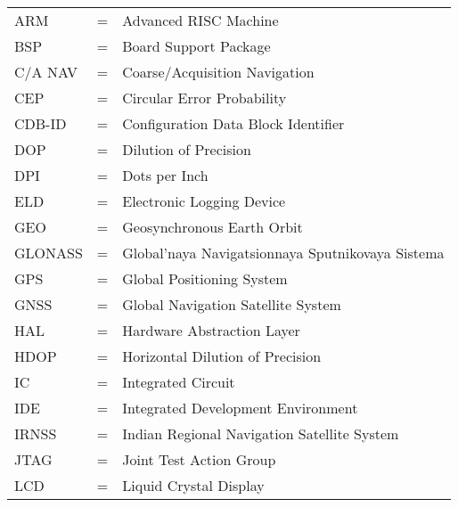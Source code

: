 
\begin{tabular}{llp{3in}}
	ARM &  \hspace{1.5cm} = & Advanced RISC Machine\\
	BSP &  \hspace{1.5cm} = & Board Support Package\\
	C/A NAV &  \hspace{1.5cm} = & Coarse/Acquisition Navigation\\
	CEP &  \hspace{1.5cm} = & Circular Error Probability \\
	CDB-ID &  \hspace{1.5cm} = & Configuration Data Block Identifier \\
	DOP &  \hspace{1.5cm} = & Dilution of Precision \\
	DPI &  \hspace{1.5cm} = & Dots per Inch \\
	ELD &  \hspace{1.5cm} = & Electronic Logging Device \\
	GEO &  \hspace{1.5cm} = & Geosynchronous Earth Orbit\\
	GLONASS &  \hspace{1.5cm} = & Global'naya Navigatsionnaya Sputnikovaya Sistema\\
	GPS &  \hspace{1.5cm} = & Global Positioning System\\
	GNSS &  \hspace{1.5cm} = & Global Navigation Satellite System\\
	HAL &  \hspace{1.5cm} = & Hardware Abstraction Layer\\
	HDOP &  \hspace{1.5cm} = & Horizontal Dilution of Precision \\
	IC &  \hspace{1.5cm} = & Integrated Circuit \\
	IDE &  \hspace{1.5cm} = & Integrated Development Environment\\
	IRNSS &  \hspace{1.5cm} = & Indian Regional Navigation Satellite System\\
	JTAG &  \hspace{1.5cm} = & Joint Test Action Group \\
	LCD &  \hspace{1.5cm} = & Liquid Crystal Display\\

\end{tabular}
